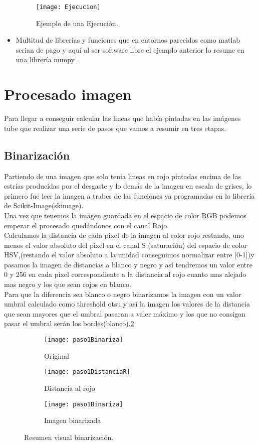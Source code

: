 \begin{itemize}
\begin{figure}[h]
\centering
\texttt{[image: Ejecucion]}
\caption{Ejemplo de una Ejecución.}
\label{fig:5.3}
\end{figure}

\item Multitud de librerías y funciones que en entornos parecidos como matlab serian de pago y aquí al ser software libre el ejemplo anterior lo resume en una librería numpy \cite{Numpy}.
\end{itemize}

\section{Procesado imagen}
Para llegar a conseguir calcular las lineas que había pintadas en las imágenes tube que realizar una serie de pasos que vamos a resumir en tres etapas.
\subsection{Binarización}
Partiendo de una imagen que solo tenia lineas en rojo pintadas encima de las estrías producidas por el desgaste y lo demás de la imagen en escala de grises, lo primero fue leer la imagen a trabes de las funciones ya programadas en la librería de Scikit-Image(skimage).\\
Una vez que tenemos la imagen guardada en el espacio de color RGB podemos empezar el procesado quedándonos con el canal Rojo.\\
Calculamos la distancia de cada pixel de la imagen al color rojo restando, uno menos el valor absoluto del pixel en el canal S (saturación) del espacio de color HSV,(restando el valor absoluto a la unidad conseguimos normalizar entre [0-1])y pasamos la imagen de distancias a blanco y negro y así tendremos un valor entre 0 y 256 en cada pixel correspondiente a la distancia al rojo cuanto mas alejado mas negro y los que sean rojos en blanco.\\
Para que la diferencia sea blanco o negro binarizamos la imagen con un valor umbral calculado como threshold otsu y así la imagen los valores de la distancia que sean mayores que el umbral pasaran a valer máximo y los que no consigan pasar el umbral serán los bordes(blanco).\ref{fig:5.4}


\begin{figure}
\begin{subfigure}[c]{.5\linewidth}
\centering\large \texttt{[image: paso1Binariza]}
\caption{Original}
\end{subfigure}%
\begin{subfigure}[c]{.5\linewidth}
\centering\large \texttt{[image: paso1DistanciaR]}
\caption{Distancia al rojo}
\end{subfigure}
\begin{subfigure}[c]{.5\linewidth}
\centering\large \texttt{[image: paso1Binariza]}
\caption{Imagen binarizada}
\end{subfigure}
\caption{Resumen visual binarización.}\label{fig:5.4}
\end{figure}


